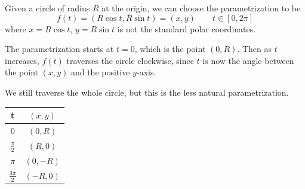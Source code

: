 \begin{example}
    Given a circle of radius $R$ at the origin, we can choose the parametrization to be $$f(t) = (R \cos{t}, R \sin{t}) = (x, y) \qquad t\in [0, 2\pi]$$ where $x = R \cos{t}$, $y = R \sin{t}$ is not the standard polar coordinates.

    The parametrization starts at $t = 0$, which is the point $(0, R)$. Then as $t$ increases, $f(t)$ traverses the circle clockwise, since $t$ is now the angle between the point $(x, y)$ and the positive $y$-axis.

    We still traverse the whole circle, but this is the less natural parametrization.

    \begin{minipage}{0.45\linewidth}
        \begin{center}
            \def\arraystretch{2}
            \begin{tabular}{c|c}
                t & $(x,y)$ \\
                \hline
                $0$ & $(0,R)$ \\
                $\frac{\pi}{2}$ & $(R,0)$ \\
                $\pi$ & $(0,-R)$ \\
                $\frac{3\pi}{2}$ & $(-R,0)$ \\
            \end{tabular}
        \end{center}
    \end{minipage}
    \begin{minipage}{0.45\linewidth}
        \begin{center}
        \end{center}
    \end{minipage}
\end{example}

